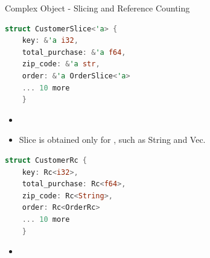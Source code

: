 \documentclass[9pt]{beamer}
\begin{document}
\begin{frame}[t,fragile]{Complex Object - Slicing and Reference Counting}

\begin{minipage}{0.5\linewidth}
\centering
\begin{lstlisting}[language=Rust]
struct CustomerSlice<'a> {
    key: &'a i32,
    total_purchase: &'a f64,
    zip_code: &'a str,
    order: &'a OrderSlice<'a>
    ... 10 more 
    }
\end{lstlisting}
\end{minipage}\hfill  
\begin{minipage}{0.5\linewidth}
\centering
\begin{itemize}
    \item {} 
    \item Slice is obtained only for , such as String and Vec.
\end{itemize}
\end{minipage}

\begin{minipage}{0.5\linewidth}
\centering
\begin{lstlisting}[language=Rust]
struct CustomerRc {
    key: Rc<i32>,
    total_purchase: Rc<f64>,
    zip_code: Rc<String>,
    order: Rc<OrderRc>
    ... 10 more 
    }
\end{lstlisting}
\end{minipage}\hfill  
\begin{minipage}{0.5\linewidth}
\centering
\begin{itemize}
    \item {}
\end{itemize}
\end{minipage}
    
\end{frame}

\end{document}
